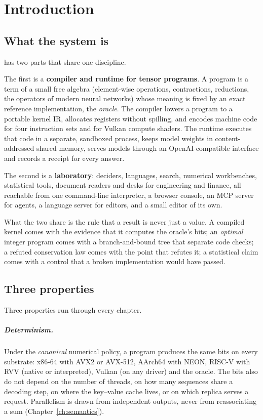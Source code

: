 \chapter{Introduction}

\section{What the system is}

\vapor{} has two parts that share one discipline.

The first is a \textbf{compiler and runtime for tensor programs}. A program is a term of a small free
algebra (element-wise operations, contractions, reductions, the operators of modern neural networks)
whose meaning is fixed by an exact reference implementation, the \emph{oracle}. The compiler lowers a
program to a portable kernel IR, allocates registers without spilling, and encodes machine code for
four instruction sets and for Vulkan compute shaders. The runtime executes that code in a separate,
sandboxed process, keeps model weights in content-addressed shared memory, serves models through an
OpenAI-compatible interface and records a receipt for every answer.

The second is a \textbf{laboratory}: deciders, languages, search, numerical workbenches, statistical
tools, document readers and desks for engineering and finance, all reachable from one command-line
interpreter, a browser console, an MCP server for agents, a language server for editors, and a small
editor of its own.

What the two share is the rule that a result is never just a value. A compiled kernel comes with the
evidence that it computes the oracle's bits; an \emph{optimal} integer program comes with a
branch-and-bound tree that separate code checks; a refuted conservation law comes with the point that
refutes it; a statistical claim comes with a control that a broken implementation would have passed.

\section{Three properties}

Three properties run through every chapter.

\paragraph{Determinism.} Under the \emph{canonical} numerical policy, a program produces the same bits
on every substrate: x86-64 with AVX2 or AVX-512, AArch64 with NEON, RISC-V with RVV (native or
interpreted), Vulkan (on any driver) and the oracle. The bits also do not depend on the number of
threads, on how many sequences share a decoding step, on where the key--value cache lives, or on which
replica serves a request. Parallelism is drawn from independent outputs, never from reassociating a sum
(Chapter~\ref{ch:semantics}).

